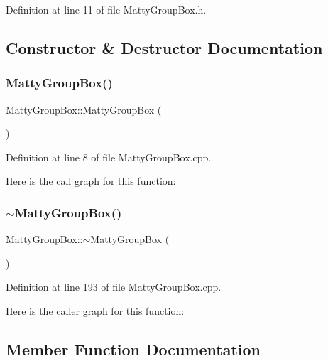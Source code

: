Definition at line 11 of file Matty\+Group\+Box.\+h.



\subsection{Constructor \& Destructor Documentation}
\hypertarget{classMattyGroupBox_aa44b29a1b8b8f5129f52c2972c24aecd}{}\label{classMattyGroupBox_aa44b29a1b8b8f5129f52c2972c24aecd} 
\subsubsection{\texorpdfstring{Matty\+Group\+Box()}{MattyGroupBox()}}
{\footnotesize\ttfamily Matty\+Group\+Box\+::\+Matty\+Group\+Box (\begin{DoxyParamCaption}{ }\end{DoxyParamCaption})}



Definition at line 8 of file Matty\+Group\+Box.\+cpp.

Here is the call graph for this function\+:
\hypertarget{classMattyGroupBox_acf5f5023cf210a83e9846a35b149dd70}{}\label{classMattyGroupBox_acf5f5023cf210a83e9846a35b149dd70} 
\subsubsection{\texorpdfstring{$\sim$\+Matty\+Group\+Box()}{~MattyGroupBox()}}
{\footnotesize\ttfamily Matty\+Group\+Box\+::$\sim$\+Matty\+Group\+Box (\begin{DoxyParamCaption}{ }\end{DoxyParamCaption})}



Definition at line 193 of file Matty\+Group\+Box.\+cpp.

Here is the caller graph for this function\+:


\subsection{Member Function Documentation}
\hypertarget{classMattyGroupBox_ae9862aae672bd2cf4a99da541beef696}{}\label{classMattyGroupBox_ae9862aae672bd2cf4a99da541beef696} 
